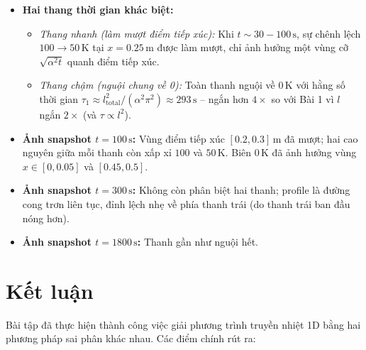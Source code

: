 \documentclass[12pt,a4paper]{article}
\begin{document}
\begin{itemize}
    \item \textbf{Hai thang thời gian khác biệt:}
    \begin{itemize}
        \item \emph{Thang nhanh (làm mượt điểm tiếp xúc):} Khi $t \sim 30\!-\!100\,\mathrm{s}$, sự chênh lệch $100 \to 50\,\mathrm{K}$ tại $x = 0.25\,\mathrm{m}$ được làm mượt, chỉ ảnh hưởng một vùng cỡ $\sqrt{\alpha^2 t}$ quanh điểm tiếp xúc.
        \item \emph{Thang chậm (nguội chung về 0):} Toàn thanh nguội về $0\,\mathrm{K}$ với hằng số thời gian $\tau_1 \approx l_{\text{total}}^2/(\alpha^2 \pi^2) \approx 293\,\mathrm{s}$ -- ngắn hơn $4\times$ so với Bài 1 vì $l$ ngắn $2\times$ (và $\tau \propto l^2$).
    \end{itemize}

    \item \textbf{Ảnh snapshot $t = 100\,\mathrm{s}$:} Vùng điểm tiếp xúc $[0.2, 0.3]\,\mathrm{m}$ đã mượt; hai cao nguyên giữa mỗi thanh còn xấp xỉ $100$ và $50\,\mathrm{K}$. Biên $0\,\mathrm{K}$ đã ảnh hưởng vùng $x \in [0, 0.05]$ và $[0.45, 0.5]$.

    \item \textbf{Ảnh snapshot $t = 300\,\mathrm{s}$:} Không còn phân biệt hai thanh; profile là đường cong trơn liên tục, đỉnh lệch nhẹ về phía thanh trái (do thanh trái ban đầu nóng hơn).

    \item \textbf{Ảnh snapshot $t = 1800\,\mathrm{s}$:} Thanh gần như nguội hết. 
    
\end{itemize}

\section{Kết luận}

Bài tập đã thực hiện thành công việc giải phương trình truyền nhiệt 1D bằng hai phương pháp sai phân khác nhau. Các điểm chính rút ra:
\end{document}
